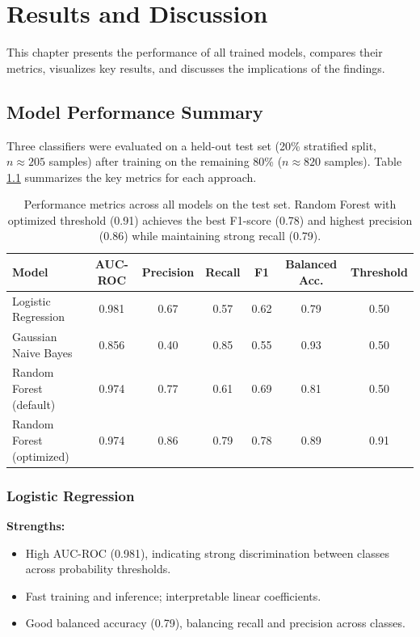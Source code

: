 \chapter{Results and Discussion}
\label{chap:results}

This chapter presents the performance of all trained models, compares their metrics, visualizes key results, and discusses the implications of the findings.

\section{Model Performance Summary}
\label{sec:model_performance}

Three classifiers were evaluated on a held-out test set (20\% stratified split, $n \approx 205$ samples) after training on the remaining 80\% ($n \approx 820$ samples). Table \ref{tab:model_comparison} summarizes the key metrics for each approach.

\begin{table}[h]
  \centering
  \begin{tabular}{|l|c|c|c|c|c|c|}
    \hline
    \textbf{Model} & \textbf{AUC-ROC} & \textbf{Precision} & \textbf{Recall} & \textbf{F1} & \textbf{Balanced Acc.} & \textbf{Threshold} \\
    \hline
    Logistic Regression & 0.981 & 0.67 & 0.57 & 0.62 & 0.79 & 0.50 \\
    \hline
    Gaussian Naive Bayes & 0.856 & 0.40 & 0.85 & 0.55 & 0.93 & 0.50 \\
    \hline
    Random Forest (default) & 0.974 & 0.77 & 0.61 & 0.69 & 0.81 & 0.50 \\
    \hline
    Random Forest (optimized) & 0.974 & 0.86 & 0.79 & 0.78 & 0.89 & 0.91 \\
    \hline
  \end{tabular}
  \caption{Performance metrics across all models on the test set. Random Forest with optimized threshold (0.91) achieves the best F1-score (0.78) and highest precision (0.86) while maintaining strong recall (0.79).}
  \label{tab:model_comparison}
\end{table}

\subsection{Logistic Regression}

\textbf{Strengths:}
\begin{itemize}
  \item High AUC-ROC (0.981), indicating strong discrimination between classes across probability thresholds.
  \item Fast training and inference; interpretable linear coefficients.
  \item Good balanced accuracy (0.79), balancing recall and precision across classes.
\end{itemize}


